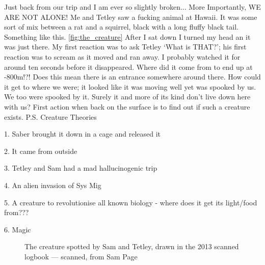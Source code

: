 Just back from our trip and I am ever so slightly broken...
More Importantly, WE ARE NOT ALONE! Me and Tetley saw a fucking animal at Hawaii. It was some sort of mix between a rat and a squirrel, black with a long fluffy black tail. Something like this. \ref{fig:the_creature}
After I sat down I turned my head an it was just there. My first reaction was to ask Tetley `What is THAT?'; his first reaction was to scream as it moved and ran away. I probably watched it for around ten seconds before it disappeared. Where did it come from to end up at -800m!?! Does this mean there is an entrance somewhere around there. How could it get to where we were; it looked like it was moving well yet was spooked by us. We too were spooked by it. Surely it and more of its kind don't live down here with us? First action when back on the surface is to find out if such a creature exists.
P.S. Creature Theories
\begin{citemize}
\item 1. Saber brought it down in a cage and released it
\item 2. It came from outside
\item 3. Tetley and Sam had a mad hallucinogenic trip
\item 4. An alien invasion of Sys Mig
\item 5. A creature to revolutionise all known biology - where does it get its light/food from???
\item 6. Magic
\end{citemize}

\begin{figure}[t!]
	\checkoddpage \ifoddpage \forcerectofloat \else \forceversofloat \fi
	\centering
	\caption{The creature spotted by Sam and Tetley, drawn in the 2013 scanned logbook --- scanned, from Sam Page}
	\label{the_creature}
\end{figure}


